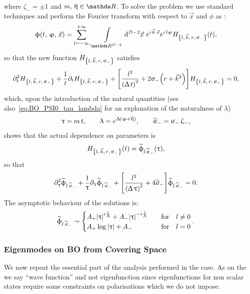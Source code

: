 where $\zeta_- = \pm 1$ and $m,\, \beta \in \R$.
To solve the problem we use standard techniques and perform the Fourier transform with respect to $\vec{x}$ and $\phi$ as :
\begin{equation}
  \phi\qty(t,\, \varphi,\, \vec{x})
  =
  \infinfsum{l}\,
  \int\limits_{\R^{D-2}} \dd[D-2]{\vec{x}}\,
  e^{i\, \vec{k} \cdot \vec x}
  e^{i\, l \varphi}
  H_{\lkrsi}(t),
\end{equation}
so that the new function $H_{\lkrsi}$ satisfies
\begin{align}
  \ipd{t}^2 H_{\lkrsi}
  +
  \frac{1}{t} \ipd{t} H_{\lkrsi}
  +
  \qty[
    \frac{l^2}{\qty(\Delta\, t)^2} 
    +
    2 \sigma_-
    \qty( r + \vec{k}^2 )
  ]
  H_{\lkrsi}
  =
  0,
\end{align}
which, upon the introduction of the natural quantities (see also~\eqref{eq:BO_PSI0_tau_lambda} for an explanation of the naturalness of $\lambda$)
\begin{equation}
  \uptau = m\, t,
  \qquad
  \uplambda = e^{\Updelta\qty(\upvarphi + \overline{\upeta})},
  \qquad
  \widehat{\upsigma}_- = \upsigma_-\, \upzeta_-,
\end{equation}
shows that the actual dependence on parameters is
\begin{equation}
  H_{\lkrsi}(t) = \tphi_{\lsi}\qty(\tau),
\end{equation}
so that
\begin{align}
  \partial_{\uptau}^2 \widetilde{\upphi}_{l\, \widehat{\upsigma}_-}
  +
  \frac{1}{\uptau} \partial_{\uptau} \widetilde{\upphi}_{l\, \widehat{\upsigma}_-}
  +
  \qty[
    \frac{l^2}{\qty(\Updelta\, \uptau)^2} 
    +
    4 \widehat{\upsigma}_-
  ]
  \widetilde{\upphi}_{l\, \widehat{\upsigma}_-}
  =
  0.
  \label{eq:BO_eq_diff_tilde_phi}
\end{align}
The asymptotic behaviour of the solutions is:
\begin{equation}
  \tphi_{\lsi} \sim
  \begin{cases}
    A_+ \abs{\tau}^{i \frac{l}{\Delta}}
    +
    A_- \abs{\tau}^{-i \frac{l}{\Delta}}
    & \qfor
    l \neq 0
    \\
    A_+ \log\abs{\tau} + A_-
    & \qfor
    l = 0
  \end{cases}.
  \label{eq:BO_asymtotics}
\end{equation}
    
\subsubsection{Eigenmodes on BO from Covering Space}

We now repeat the essential part of the analysis performed in the \nbo case.
As on the \nbo we say ``wave function'' and not eigenfunction since eigenfunctions for non scalar states require some  constraints on polarisations which we do not impose.



